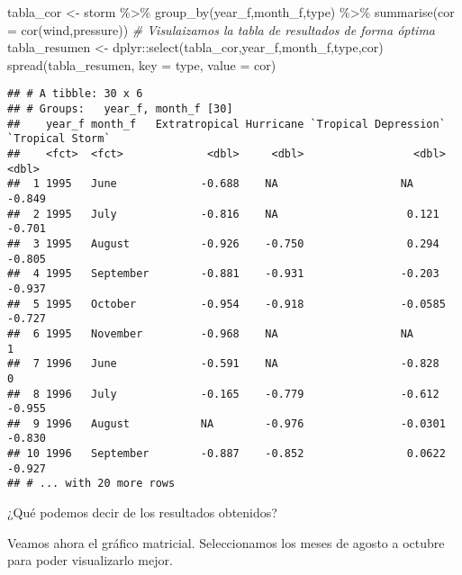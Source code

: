 \documentclass[
]{book}
\newenvironment{Shaded}{\begin{snugshade}}{\end{snugshade}}
\newcommand{\AttributeTok}[1]{\textcolor[rgb]{0.77,0.63,0.00}{#1}}
\newcommand{\CommentTok}[1]{\textcolor[rgb]{0.56,0.35,0.01}{\textit{#1}}}
\newcommand{\FunctionTok}[1]{\textcolor[rgb]{0.00,0.00,0.00}{#1}}
\newcommand{\NormalTok}[1]{#1}
\newcommand{\OtherTok}[1]{\textcolor[rgb]{0.56,0.35,0.01}{#1}}
\newcommand{\SpecialCharTok}[1]{\textcolor[rgb]{0.00,0.00,0.00}{#1}}
\begin{document}
\begin{Shaded}
\begin{Highlighting}[]
\NormalTok{tabla\_cor }\OtherTok{\textless{}{-}}\NormalTok{ storm }\SpecialCharTok{\%\textgreater{}\%} 
  \FunctionTok{group\_by}\NormalTok{(year\_f,month\_f,type) }\SpecialCharTok{\%\textgreater{}\%} 
  \FunctionTok{summarise}\NormalTok{(}\AttributeTok{cor =} \FunctionTok{cor}\NormalTok{(wind,pressure))}
\CommentTok{\# Visulaizamos la tabla de resultados de forma óptima}
\NormalTok{tabla\_resumen }\OtherTok{\textless{}{-}}\NormalTok{ dplyr}\SpecialCharTok{::}\FunctionTok{select}\NormalTok{(tabla\_cor,year\_f,month\_f,type,cor)}
\FunctionTok{spread}\NormalTok{(tabla\_resumen, }\AttributeTok{key =}\NormalTok{ type, }\AttributeTok{value =}\NormalTok{ cor)}
\end{Highlighting}
\end{Shaded}

\begin{verbatim}
## # A tibble: 30 x 6
## # Groups:   year_f, month_f [30]
##    year_f month_f   Extratropical Hurricane `Tropical Depression` `Tropical Storm`
##    <fct>  <fct>             <dbl>     <dbl>                 <dbl>            <dbl>
##  1 1995   June             -0.688    NA                   NA                -0.849
##  2 1995   July             -0.816    NA                    0.121            -0.701
##  3 1995   August           -0.926    -0.750                0.294            -0.805
##  4 1995   September        -0.881    -0.931               -0.203            -0.937
##  5 1995   October          -0.954    -0.918               -0.0585           -0.727
##  6 1995   November         -0.968    NA                   NA                 1    
##  7 1996   June             -0.591    NA                   -0.828             0    
##  8 1996   July             -0.165    -0.779               -0.612            -0.955
##  9 1996   August           NA        -0.976               -0.0301           -0.830
## 10 1996   September        -0.887    -0.852                0.0622           -0.927
## # ... with 20 more rows
\end{verbatim}

¿Qué podemos decir de los resultados obtenidos?

Veamos ahora el gráfico matricial. Seleccionamos los meses de agosto a octubre para poder visualizarlo mejor.
\end{document}
